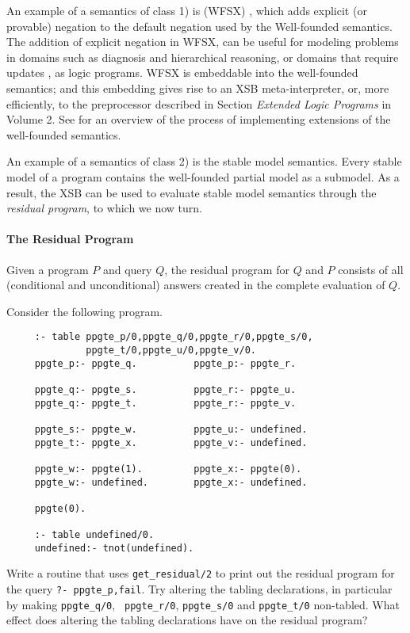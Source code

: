 An example of a semantics of class 1) is (WFSX) \cite{ADP95}, which
adds explicit (or provable) negation to the default negation used by
the Well-founded semantics.  The addition of explicit negation in
WFSX, can be useful for modeling problems in domains such as diagnosis
and hierarchical reasoning, or domains that require updates
\cite{Leit97}, as logic programs.  WFSX is embeddable into the
well-founded semantics; and this embedding gives rise to an XSB
meta-interpreter, or, more efficiently, to the preprocessor described
in Section {\it Extended Logic Programs} in Volume 2.  See
\cite{Swif99a} for an overview of the process of implementing
extensions of the well-founded semantics.

An example of a semantics of class 2) is the stable model semantics.
Every stable model of a program contains the well-founded partial
model as a submodel.  As a result, the XSB can be used to evaluate
stable model semantics through the {\em residual program}, to which we
now turn.

\paragraph*{The Residual Program}

Given a program $P$ and query $Q$, the residual program for $Q$ and
$P$ consists of all (conditional and unconditional) answers created in
the complete evaluation of $Q$.  

\begin{exercise} \label{ex:pos-delay}
Consider the following program.
\begin{verbatim}
     :- table ppgte_p/0,ppgte_q/0,ppgte_r/0,ppgte_s/0,
              ppgte_t/0,ppgte_u/0,ppgte_v/0.
     ppgte_p:- ppgte_q.          ppgte_p:- ppgte_r.

     ppgte_q:- ppgte_s.          ppgte_r:- ppgte_u.
     ppgte_q:- ppgte_t.          ppgte_r:- ppgte_v.

     ppgte_s:- ppgte_w.          ppgte_u:- undefined.
     ppgte_t:- ppgte_x.          ppgte_v:- undefined.

     ppgte_w:- ppgte(1).         ppgte_x:- ppgte(0).
     ppgte_w:- undefined.        ppgte_x:- undefined.

     ppgte(0).

     :- table undefined/0.
     undefined:- tnot(undefined).
\end{verbatim}
Write a routine that uses {\tt get\_residual/2} to print out the
residual program for the query {\tt ?- ppgte\_p,fail}.  Try altering the
tabling declarations, in particular by making {\tt ppgte\_q/0}, {\tt
ppgte\_r/0}, {\tt ppgte\_s/0} and {\tt ppgte\_t/0} non-tabled.  What
effect does altering the tabling declarations have on the residual
program?
\end{exercise}

